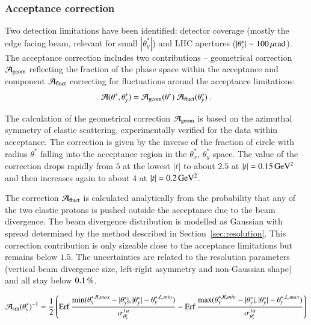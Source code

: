 
\subsubsection{Acceptance correction}
\label{sec:acc corr}

Two detection limitations have been identified: detector coverage (mostly the edge facing beam, relevant for small $|\theta_y^*|$) and LHC apertures ($|\theta_y^*| \sim 100\,{\rm \mu rad}$). The acceptance correction includes two contributions -- geometrical correction ${\cal A}_{\rm geom}$ reflecting the fraction of the phase space within the acceptance and component ${\cal A}_{\rm fluct}$ correcting for fluctuations around the acceptance limitations:
\begin{equation}
{\cal A}(\theta^*, \theta_y^*) = {\cal A}_{\rm geom}(\theta^*)\ {\cal A}_{\rm fluct}(\theta_y^*)\ .
\end{equation}

The calculation of the geometrical correction ${\cal A}_{\rm geom}$ is based on the azimuthal symmetry of elastic scattering, experimentally verified for the data within acceptance. The correction is given by the inverse of the fraction of circle with radius $\theta^*$ falling into the acceptance region in the $\theta_x^*$, $\theta_y^*$ space. The value of the correction drops rapidly from $5$ at the lowest $|t|$ to about $2.5$ at $|t| = 0.15\,{\rm GeV^2}$ and then increases again to about $4$ at $|t| = 0.2\,{\rm GeV^2}$.

The correction ${\cal A}_{\rm fluct}$ is calculated analytically from the probability that any of the two elastic protons is pushed outside the acceptance due to the beam divergence. The beam divergence distribution is modelled as Gaussian with spread determined by the method described in Section~\ref{sec:resolution}. This correction contribution is only sizeable close to the acceptance limitations but remains below $1.5$. The uncertainties are related to the resolution parameters (vertical beam divergence size, left-right asymmetry and non-Gaussian shape) and all stay below $0.1\,{\rm \%}$.


\iffalse
\begin{equation}
\label{acceptance}
{\cal A_{\rm sm}}(\theta_y^*)^{-1} = {1\over 2} \left(
	\mathop{\rm Erf} {\min(\theta_y^{*,R,max} - |\theta_y^*|, |\theta_y^*| - \theta_y^{*,L,min})\over \sigma^{1a}_{\theta_y^*}}
	- \mathop{\rm Erf} {\max(\theta_y^{*,R,min} - |\theta_y^*|, |\theta_y^*| - \theta_y^{*,L,max})\over \sigma^{1a}_{\theta_y^*}}
\right)
\end{equation}

